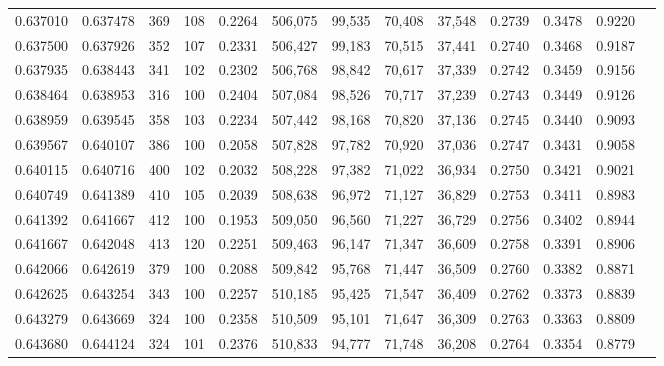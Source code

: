 \begin{tabular}{rrrrrrrrrrrrr}
0.637010 & 0.637478 &    369 &   108 &                                     0.2264 & 506,075 &  99,535 &  70,408 &  37,548 & 0.2739 & 0.3478 & 0.9220 \\
0.637500 & 0.637926 &    352 &   107 &                                     0.2331 & 506,427 &  99,183 &  70,515 &  37,441 & 0.2740 & 0.3468 & 0.9187 \\
0.637935 & 0.638443 &    341 &   102 &                                     0.2302 & 506,768 &  98,842 &  70,617 &  37,339 & 0.2742 & 0.3459 & 0.9156 \\
0.638464 & 0.638953 &    316 &   100 &                                     0.2404 & 507,084 &  98,526 &  70,717 &  37,239 & 0.2743 & 0.3449 & 0.9126 \\
0.638959 & 0.639545 &    358 &   103 &                                     0.2234 & 507,442 &  98,168 &  70,820 &  37,136 & 0.2745 & 0.3440 & 0.9093 \\
0.639567 & 0.640107 &    386 &   100 &                                     0.2058 & 507,828 &  97,782 &  70,920 &  37,036 & 0.2747 & 0.3431 & 0.9058 \\
0.640115 & 0.640716 &    400 &   102 &                                     0.2032 & 508,228 &  97,382 &  71,022 &  36,934 & 0.2750 & 0.3421 & 0.9021 \\
0.640749 & 0.641389 &    410 &   105 &                                     0.2039 & 508,638 &  96,972 &  71,127 &  36,829 & 0.2753 & 0.3411 & 0.8983 \\
0.641392 & 0.641667 &    412 &   100 &                                     0.1953 & 509,050 &  96,560 &  71,227 &  36,729 & 0.2756 & 0.3402 & 0.8944 \\
0.641667 & 0.642048 &    413 &   120 &                                     0.2251 & 509,463 &  96,147 &  71,347 &  36,609 & 0.2758 & 0.3391 & 0.8906 \\
0.642066 & 0.642619 &    379 &   100 &                                     0.2088 & 509,842 &  95,768 &  71,447 &  36,509 & 0.2760 & 0.3382 & 0.8871 \\
0.642625 & 0.643254 &    343 &   100 &                                     0.2257 & 510,185 &  95,425 &  71,547 &  36,409 & 0.2762 & 0.3373 & 0.8839 \\
0.643279 & 0.643669 &    324 &   100 &                                     0.2358 & 510,509 &  95,101 &  71,647 &  36,309 & 0.2763 & 0.3363 & 0.8809 \\
0.643680 & 0.644124 &    324 &   101 &                                     0.2376 & 510,833 &  94,777 &  71,748 &  36,208 & 0.2764 & 0.3354 & 0.8779 \\

\end{tabular}
